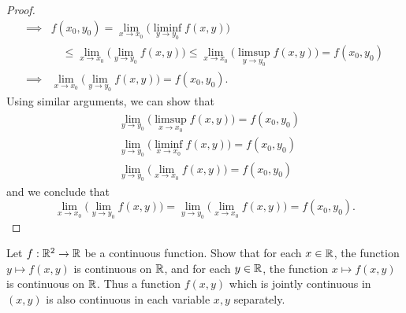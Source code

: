 \begin{proof}
\begin{align*}
    \implies & f(x_0, y_0) = \lim_{x \to x_0} \big(\liminf_{y \to y_0} f(x, y)\big)                                                                     \\
             & \quad \leq \lim_{x \to x_0} \big(\lim_{y \to y_0} f(x, y)\big) \leq \lim_{x \to x_0} \big(\limsup_{y \to y_0} f(x, y)\big) = f(x_0, y_0) \\
    \implies & \lim_{x \to x_0} \big(\lim_{y \to y_0} f(x, y)\big) = f(x_0, y_0).
  \end{align*}
  Using similar arguments, we can show that
  \begin{align*}
     & \lim_{y \to y_0} \big(\limsup_{x \to x_0} f(x, y)\big) = f(x_0, y_0) \\
     & \lim_{y \to y_0} \big(\liminf_{x \to x_0} f(x, y)\big) = f(x_0, y_0) \\
     & \lim_{y \to y_0} \big(\lim_{x \to x_0} f(x, y)\big) = f(x_0, y_0)
  \end{align*}
  and we conclude that
  \[
    \lim_{x \to x_0} \big(\lim_{y \to y_0} f(x, y)\big) = \lim_{y \to y_0} \big(\lim_{x \to x_0} f(x, y)\big) = f(x_0, y_0).
  \]
\end{proof}

\begin{ex}\label{ii:ex:2.2.10}
  Let \(f : \mathbb{R}^2 \to \mathbb{R}\) be a continuous function.
  Show that for each \(x \in \mathbb{R}\), the function \(y \mapsto f(x, y)\) is continuous on \(\mathbb{R}\), and for each \(y \in \mathbb{R}\), the function \(x \mapsto f(x, y)\) is continuous on \(\mathbb{R}\).
  Thus a function \(f(x, y)\) which is jointly continuous in \((x, y)\) is also continuous in each variable \(x, y\) separately.
\end{ex}

